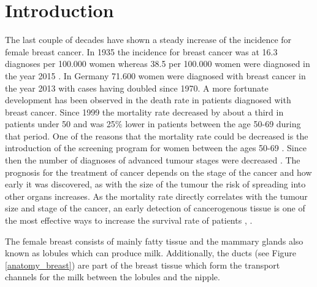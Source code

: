 \chapter{Introduction}
\label{chap:introduction}


The last couple of decades have shown a steady increase of the incidence for female breast cancer.
In 1935 the incidence for breast cancer was at 16.3 diagnoses per 100.000 women whereas 38.5 per 100.000 women were diagnosed in the year 2015 \cite{Lima2020Trends2015}.
In Germany 71.600 women were diagnosed with breast cancer in the year 2013 with cases having doubled since 1970. A more fortunate development has been observed in the death rate in patients diagnosed with breast cancer. Since 1999 the mortality rate decreased by about a third in patients under 50 and was 25\% lower in patients between the age 50-69 during that period. 
One of the reasons that the mortality rate could be decreased is the introduction of the screening program for women between the ages 50-69 \cite{Hubner2020Long-termGermany}. Since then the number of diagnoses of advanced tumour stages were decreased \cite{RobertKoch-Institut2016Bericht2016}.
The prognosis for the treatment of cancer depends on the stage of the cancer and how early it was discovered, as with the size of the tumour the risk of spreading into other organs increases. As the mortality rate directly correlates with the tumour size and stage of the cancer, an early detection of cancerogenous tissue is one of the most effective ways to increase the survival rate of patients \cite{Veronesi1985PrognosisNodes}, \cite{Welch2016Breast-CancerEffectiveness}.


The female breast consists of mainly fatty tissue and the mammary glands also known as lobules which can produce milk. Additionally, the ducts (see Figure \ref{anatomy_breast}) are part of the breast tissue which form the transport channels for the milk between the lobules and the nipple.

